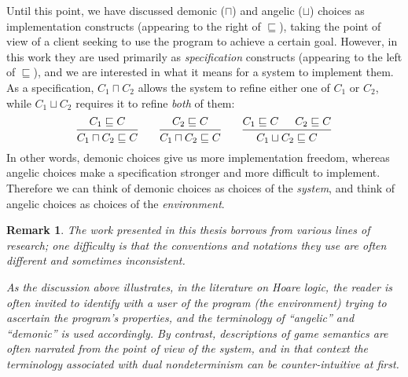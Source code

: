 \documentclass[11pt,oneside,draft]{book}
\newtheorem{remark}[theorem]{Remark}
\theoremstyle{definition}
\begin{document}
Until this point,
we have discussed demonic ($\sqcap$) and angelic ($\sqcup$) choices
as implementation constructs
(appearing to the right of $\sqsubseteq$),
taking the point of view of a client
seeking to use the program to achieve a certain goal.
However,
in this work they are used primarily
as \emph{specification} constructs
(appearing to the left of $\sqsubseteq$),
and we are interested in what it means
for a system to implement them.
%
As a specification, $C_1 \sqcap C_2$
allows the system to refine either one of $C_1$ or $C_2$, while
$C_1 \sqcup C_2$ requires it to refine
\emph{both} of them:
\[
  \begin{prooftree}
    \hypo{C_1 \sqsubseteq C}
    \infer1{C_1 \sqcap C_2 \sqsubseteq C}
  \end{prooftree}
  \qquad
  \begin{prooftree}
    \hypo{C_2 \sqsubseteq C}
    \infer1{C_1 \sqcap C_2 \sqsubseteq C}
  \end{prooftree}
  \qquad
  \begin{prooftree}
    \hypo{C_1 \sqsubseteq C}
    \hypo{C_2 \sqsubseteq C}
    \infer2{C_1 \sqcup C_2 \sqsubseteq C}
  \end{prooftree}
\]
In other words,
demonic choices
give us more
implementation freedom,
whereas angelic choices make a specification
stronger and more difficult to implement.
Therefore we can think of demonic choices as
choices of the \emph{system}, %
and think of angelic choices as
choices of the \emph{environment}.

\begin{remark}
The work presented in this thesis
borrows from various lines of research;
one difficulty is that
the conventions and notations they use
are often different and sometimes inconsistent.

As the discussion above illustrates,
in the literature on Hoare logic,
the reader is often invited to identify with
a \emph{user} of the program (the environment)
trying to ascertain the program's properties,
and the terminology of ``angelic'' and ``demonic''
is used accordingly.
By contrast,
descriptions of game semantics are often narrated
from the point of view of the \emph{system},
and in that context the terminology
associated with dual nondeterminism
can be counter-intuitive at first.
\end{remark}
\end{document}
